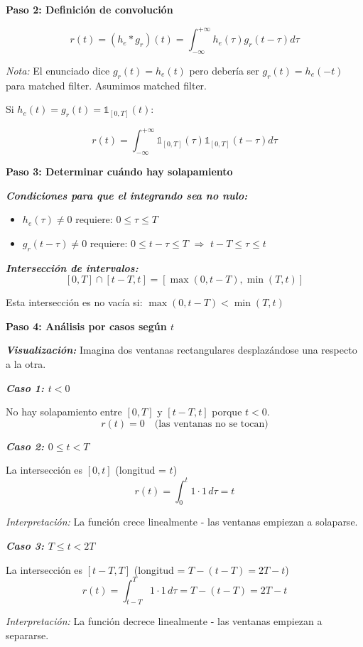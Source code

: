 \documentclass[11pt,a4paper]{article}
\begin{document}
\textbf{Paso 2: Definici\'on de convoluci\'on}

\[
r(t) = (h_e * g_r)(t) = \int_{-\infty}^{+\infty} h_e(\tau) g_r(t-\tau) d\tau
\]

\textit{Nota:} El enunciado dice $g_r(t) = h_e(t)$ pero deber\'ia ser $g_r(t) = h_e(-t)$ para matched filter. Asumimos matched filter.

Si $h_e(t) = g_r(t) = \mathds{1}_{[0,T]}(t)$:

\[
r(t) = \int_{-\infty}^{+\infty} \mathds{1}_{[0,T]}(\tau) \mathds{1}_{[0,T]}(t-\tau) d\tau
\]

\textbf{Paso 3: Determinar cu\'ando hay solapamiento}

\textit{\textbf{Condiciones para que el integrando sea no nulo:}}
\begin{itemize}
    \item $h_e(\tau) \neq 0$ requiere: $0 \leq \tau \leq T$
    \item $g_r(t-\tau) \neq 0$ requiere: $0 \leq t-\tau \leq T$ \quad $\Rightarrow$ \quad $t-T \leq \tau \leq t$
\end{itemize}

\textit{\textbf{Intersecci\'on de intervalos:}}
\[
[0, T] \cap [t-T, t] = [\max(0, t-T), \min(T, t)]
\]

Esta intersecci\'on es no vac\'ia si: $\max(0, t-T) < \min(T, t)$

\textbf{Paso 4: An\'alisis por casos seg\'un $t$}

\textit{\textbf{Visualizaci\'on:}} Imagina dos ventanas rectangulares desplaz\'andose una respecto a la otra.

\textit{\textbf{Caso 1: $t < 0$}}

No hay solapamiento entre $[0,T]$ y $[t-T, t]$ porque $t < 0$.
\[
r(t) = 0 \quad \text{(las ventanas no se tocan)}
\]

\textit{\textbf{Caso 2: $0 \leq t < T$}}

La intersecci\'on es $[0, t]$ (longitud = $t$)
\[
r(t) = \int_0^t 1 \cdot 1 \, d\tau = t
\]

\textit{Interpretaci\'on:} La funci\'on crece linealmente - las ventanas empiezan a solaparse.

\textit{\textbf{Caso 3: $T \leq t < 2T$}}

La intersecci\'on es $[t-T, T]$ (longitud = $T - (t-T) = 2T - t$)
\[
r(t) = \int_{t-T}^T 1 \cdot 1 \, d\tau = T - (t-T) = 2T - t
\]

\textit{Interpretaci\'on:} La funci\'on decrece linealmente - las ventanas empiezan a separarse.
\end{document}
